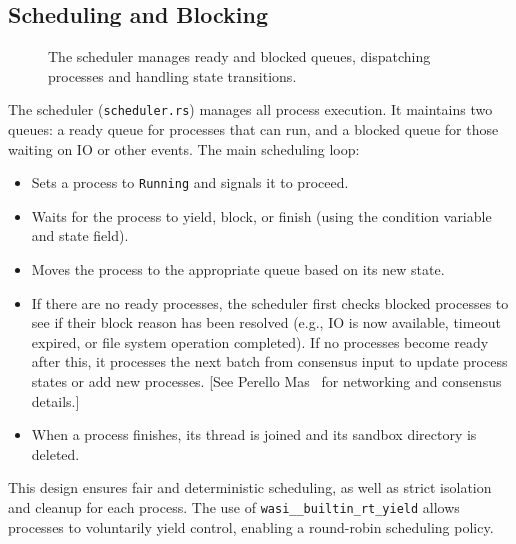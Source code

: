 \documentclass[10pt,a4paper,twocolumn]{IEEEtran}
\begin{document}
\subsection*{Scheduling and Blocking}
\begin{figure}[h]
    \centering
    \caption{The scheduler manages ready and blocked queues, dispatching processes and handling state transitions.}
    \label{fig:scheduler-operation}
\end{figure}

The scheduler (\texttt{scheduler.rs}) manages all process execution. It maintains two queues: a ready queue for processes that can run, and a blocked queue for those waiting on IO or other events. The main scheduling loop:
\begin{itemize}
    \item Sets a process to \texttt{Running} and signals it to proceed.
    \item Waits for the process to yield, block, or finish (using the condition variable and state field).
    \item Moves the process to the appropriate queue based on its new state.
    \item If there are no ready processes, the scheduler first checks blocked processes to see if their block reason has been resolved (e.g., IO is now available, timeout expired, or file system operation completed). If no processes become ready after this, it processes the next batch from consensus input to update process states or add new processes. [See Perello Mas~\cite{perellomas2025} for networking and consensus details.]
    \item When a process finishes, its thread is joined and its sandbox directory is deleted.
\end{itemize}
This design ensures fair and deterministic scheduling, as well as strict isolation and cleanup for each process. The use of \texttt{wasi\_\_builtin\_rt\_yield} allows processes to voluntarily yield control, enabling a round-robin scheduling policy.
\end{document}
